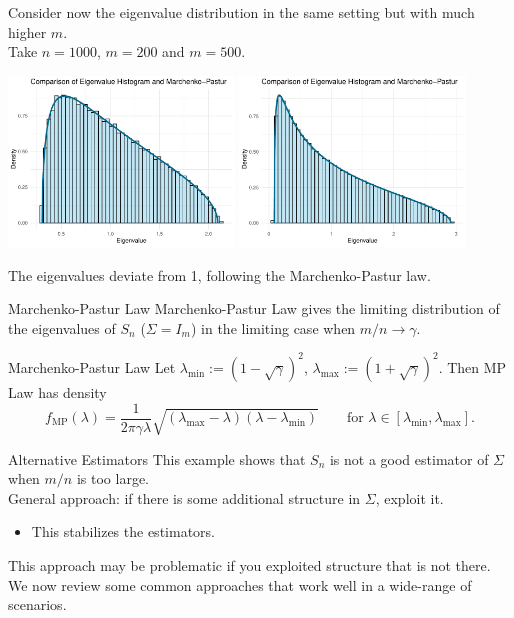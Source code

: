 \documentclass[11pt,handout,aspectratio=169]{beamer}
\begin{document}
\begin{frame}{}
  Consider now the eigenvalue distribution in the same setting but with much higher $m$. \\[5mm]

Take $n=1000$, $m=200$  and $m=500$. 
  \begin{center}
    \includegraphics[width=0.45\textwidth]{pics/HDcov1.pdf}
    \includegraphics[width=0.45\textwidth]{pics/HDcov2.pdf}
  \end{center}
  The eigenvalues deviate from 1, following the \alert{Marchenko-Pastur law}.
\end{frame}

\begin{frame}{Marchenko-Pastur Law}
Marchenko-Pastur Law gives the limiting distribution of the eigenvalues of $S_n$ ($\Sigma=I_m$) in the limiting case when $m/n \to \gamma$.\\[5mm]

\begin{block}{Marchenko-Pastur Law}
	Let $\lambda_{\min}:=(1-\sqrt{\gamma})^2$, $\lambda_{\max}:=(1+\sqrt{\gamma})^2$. Then MP Law has density
	$$
	f_{\mathrm{MP}}(\lambda) = \frac{1}{2\pi\gamma\lambda}\sqrt{(\lambda_{\max}-\lambda)(\lambda-\lambda_{\min})}\qquad \mbox{for }\lambda\in [\lambda_{\min},\lambda_{\max}].
	$$
\end{block}
\end{frame}

\begin{frame}{Alternative Estimators}
	This example shows that $S_n$ is not a good estimator of $\Sigma$ when $m/n$ is too large.\\[5mm]
	General approach: if there is some additional structure in $\Sigma$, exploit it.
	\begin{itemize}
		\item This stabilizes the estimators.\\[5mm]
	\end{itemize}
	This approach may be problematic if you exploited structure that is not there. \\[5mm]
	We now review some common approaches that work well in a wide-range of scenarios. 
\end{frame}
\end{document}
